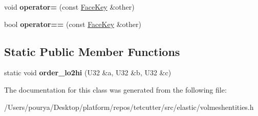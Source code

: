 \begin{DoxyCompactItemize}
\item 
\hypertarget{classps_1_1elastic_1_1FaceKey_a585adb782c6a99bb0c50b5e7be4df3c1}{}void {\bfseries operator=} (const \hyperlink{classps_1_1elastic_1_1FaceKey}{Face\+Key} \&other)\label{classps_1_1elastic_1_1FaceKey_a585adb782c6a99bb0c50b5e7be4df3c1}

\item 
\hypertarget{classps_1_1elastic_1_1FaceKey_a2522f8c9c12ff195ba3bff0863d35a8b}{}bool {\bfseries operator==} (const \hyperlink{classps_1_1elastic_1_1FaceKey}{Face\+Key} \&other)\label{classps_1_1elastic_1_1FaceKey_a2522f8c9c12ff195ba3bff0863d35a8b}

\end{DoxyCompactItemize}
\subsection*{Static Public Member Functions}
\begin{DoxyCompactItemize}
\item 
\hypertarget{classps_1_1elastic_1_1FaceKey_a1b78f9b3744a5a22b9624faf91451336}{}static void {\bfseries order\+\_\+lo2hi} (U32 \&a, U32 \&b, U32 \&c)\label{classps_1_1elastic_1_1FaceKey_a1b78f9b3744a5a22b9624faf91451336}

\end{DoxyCompactItemize}


The documentation for this class was generated from the following file\+:\begin{DoxyCompactItemize}
\item 
/\+Users/pourya/\+Desktop/platform/repos/tetcutter/src/elastic/volmeshentities.\+h\end{DoxyCompactItemize}
